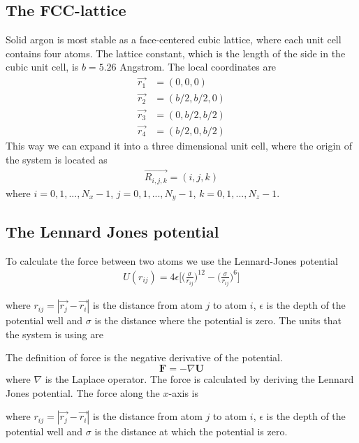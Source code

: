 \documentclass{article}
\begin{document}
\subsection{The FCC-lattice}

Solid argon is most stable as a face-centered cubic lattice, where each unit cell contains four atoms. The lattice constant, which is the length of the side in the cubic unit cell, is $b=5.26$ Angstrom. The local coordinates are
\begin{align*}
	\vec{r_1} &= (0,0,0)\\
	\vec{r_2} &= (b/2,b/2,0)\\
	\vec{r_3} &= (0,b/2,b/2)\\
	\vec{r_4} &= (b/2,0,b/2)
\end{align*}
This way we can expand it into a three dimensional unit cell, where the origin of the system is located as
\begin{align*}
	\vec{R_{i,j,k}}=(i,j,k)
\end{align*}
where $i=0,1,...,N_x-1$, $j=0,1,...,N_y-1$, $k=0,1,...,N_z-1$.
\subsection{The Lennard Jones potential}

To calculate the force between two atoms we use the Lennard-Jones potential
\begin{align}
	U(r_{ij})=4\epsilon\Big[\Big(\frac{\sigma}{r_{ij}}\Big)^{12}-\Big(\frac{\sigma}{r_{ij}}\Big)^{6}\Big]
\end{align}

where $r_{ij}=|\vec{r_j}-\vec{r_i}|$ is the distance from atom $j$ to atom $i$, $\epsilon$ is the depth of the potential well and $\sigma$ is the distance where the potential is zero. The units that the system is using are

The definition of force is the negative derivative of the potential.
$$\mathbf{F}=-\nabla \mathbf{U}$$
where $\nabla$ is the Laplace operator.
The force is calculated by deriving the Lennard Jones potential. The force along the $x$-axis is

where $r_{ij}=|\vec{r_j}-\vec{r_i}|$ is the distance from atom $j$ to atom $i$, $\epsilon$ is the depth of the potential well and $\sigma$ is the distance at which the potential is zero.
\end{document}
